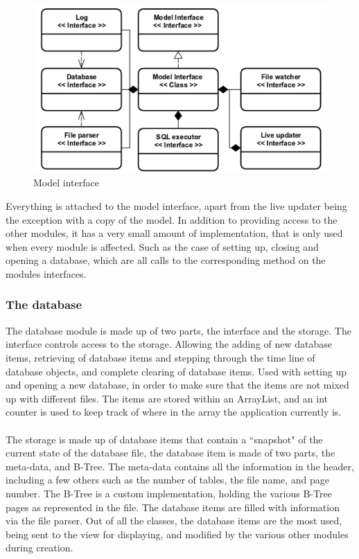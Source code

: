 \begin{figure}[H]
	\centering
	\includegraphics[scale=0.3]{images/model_interface_design.png}
	\caption{Model interface}
	\label{fig:model_interface_design}
\end{figure}

Everything is attached to the model interface, apart from the live updater being the exception with a copy of the model. In addition to providing access to the other modules, it has a very small amount of implementation, that is only used when every module is affected. Such as the case of setting up, closing and opening a database, which are all calls to the corresponding method on the modules interfaces. 

\subsubsection{The database}
\label{subsubsec:databse_imp}

The database module is made up of two parts, the interface and the storage. The interface controls access to the storage. Allowing the adding of new database items, retrieving of database items and stepping through the time line of database objects, and complete clearing of database items. Used with setting up and opening a new database, in order to make sure that the items are not mixed up with different files. The items are stored within an ArrayList, and an int counter is used to keep track of where in the array the application currently is.
\\\\
The storage is made up of database items that contain a ``snapshot" of the current state of the database file, the database item is made of two parts, the meta-data, and B-Tree. The meta-data contains all the information in the header, including a few others such as the number of tables, the file name, and page number. The B-Tree is a custom implementation, holding the various B-Tree pages as represented in the file. The database items are filled with information via the file parser. Out of all the classes, the database items are the most used, being sent to the view for displaying, and modified by the various other modules during creation. 

